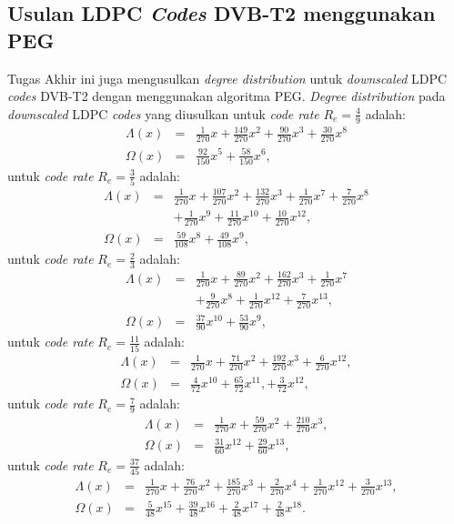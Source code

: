 \subsection{Usulan LDPC \textit{Codes} DVB-T2 menggunakan PEG}
Tugas Akhir ini juga mengusulkan \textit{degree distribution} untuk \textit{downscaled} LDPC \textit{codes} DVB-T2 dengan menggunakan algoritma PEG. \textit{Degree distribution} pada \textit{downscaled} LDPC \textit{codes} yang diusulkan untuk \textit{code rate} $R_e=\frac{4}{9}$ adalah:
\begin{eqnarray}
\Lambda (x) &=& \frac{1}{270}x+\frac{149}{270}x^2+\frac{90}{270}x^3+\frac{30}{270}x^8 \\
\Omega(x) &=& \frac{92}{150}x^5+\frac{58}{150}x^6,
\end{eqnarray}
untuk \textit{code rate} $R_e=\frac{3}{5}$ adalah:
\begin{eqnarray}
\Lambda (x) &=& \frac{1}{270}x+\frac{107}{270}x^2+\frac{132}{270}x^3+\frac{1}{270}x^7+\frac{7}{270}x^8 \nonumber \\ &&+\frac{1}{270}x^9+\frac{11}{270}x^{10}+\frac{10}{270}x^{12},   \\
\Omega(x) &=& \frac{59}{108}x^8+\frac{49}{108}x^9,
\end{eqnarray}
untuk \textit{code rate} $R_e=\frac{2}{3}$ adalah:
\begin{eqnarray}
\Lambda (x) &=& \frac{1}{270}x+\frac{89}{270}x^2+\frac{162}{270}x^3+\frac{1}{270}x^7 \nonumber \\ &&+\frac{9}{270}x^8+\frac{1}{270}x^{12}+\frac{7}{270}x^{13} ,  \\
\Omega(x) &=& \frac{37}{90}x^{10}+\frac{53}{90}x^9,
\end{eqnarray}
untuk \textit{code rate} $R_e=\frac{11}{15}$ adalah:
\begin{eqnarray}
\Lambda (x) &=& \frac{1}{270}x+\frac{71}{270}x^2+\frac{192}{270}x^3+\frac{6}{270}x^{12},   \\
\Omega(x) &=& \frac{4}{72}x^{10}+\frac{65}{72}x^{11},+\frac{3}{72}x^{12},
\end{eqnarray}
untuk \textit{code rate} $R_e=\frac{7}{9}$ adalah:
\begin{eqnarray}
\Lambda (x) &=& \frac{1}{270}x+\frac{59}{270}x^2+\frac{210}{270}x^3,  \\
\Omega(x) &=& \frac{31}{60}x^{12}+\frac{29}{60}x^{13},
\end{eqnarray}
untuk \textit{code rate} $R_e=\frac{37}{45}$ adalah:
\begin{eqnarray}
\Lambda (x) &=& \frac{1}{270}x+\frac{76}{270}x^2+\frac{185}{270}x^3 +\frac{2}{270}x^4+\frac{1}{270}x^{12}+\frac{3}{270}x^{13},  \\
\Omega(x) &=& \frac{5}{48}x^{15}+\frac{39}{48}x^{16}+\frac{2}{48}x^{17}+\frac{2}{48}x^{18}.
\end{eqnarray}


